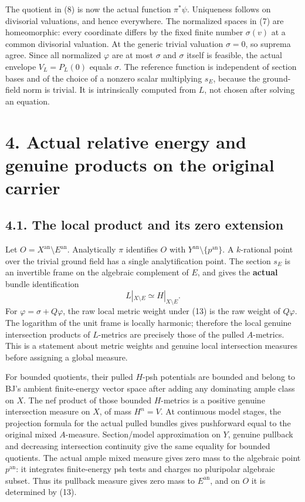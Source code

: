 \documentclass[
  10pt,
]{article}
\begin{document}
The quotient in (8) is now the actual function \(\pi^*\psi\). Uniqueness
follows on divisorial valuations, and hence everywhere. The normalized
spaces in (7) are homeomorphic: every coordinate differs by the fixed
finite number \(\sigma(v)\) at a common divisorial valuation. At the
generic trivial valuation \(\sigma=0\), so suprema agree. Since all
normalized \(\varphi\) are at most \(\sigma\) and \(\sigma\) itself is
feasible, the actual envelope \(V_L=P_L(0)\) equals \(\sigma\). The
reference function is independent of section bases and of the choice of
a nonzero scalar multiplying \(s_E\), because the ground-field norm is
trivial. It is intrinsically computed from \(L\), not chosen after
solving an equation.

\section{4. Actual relative energy and genuine products on the original
carrier}\label{actual-relative-energy-and-genuine-products-on-the-original-carrier}

\subsection{4.1. The local product and its zero
extension}\label{the-local-product-and-its-zero-extension}

Let \(O=X^{\mathrm{an}}\setminus E^{\mathrm{an}}\). Analytically \(\pi\)
identifies \(O\) with \(Y^{\mathrm{an}}\setminus\{p^{\mathrm{an}}\}\). A
\(k\)-rational point over the trivial ground field has a single
analytification point. The section \(s_E\) is an invertible frame on the
algebraic complement of \(E\), and gives the \textbf{actual} bundle
identification \[ L|_{X\setminus E}\simeq H|_{X\setminus E}. \tag{13} \]
For \(\varphi=\sigma+Q\varphi\), the raw local metric weight under (13)
is the raw weight of \(Q\varphi\). The logarithm of the unit frame is
locally harmonic; therefore the local genuine intersection products of
\(L\)-metrics are precisely those of the pulled \(A\)-metrics. This is a
statement about metric weights and genuine local intersection measures
before assigning a global measure.

For bounded quotients, their pulled \(H\)-psh potentials are bounded and
belong to BJ's ambient finite-energy vector space after adding any
dominating ample class on \(X\). The nef product of those bounded
\(H\)-metrics is a positive genuine intersection measure on \(X\), of
mass \(H^n=V\). At continuous model stages, the projection formula for
the actual pulled bundles gives pushforward equal to the original mixed
\(A\)-measure. Section/model approximation on \(Y\), genuine pullback
and decreasing intersection continuity give the same equality for
bounded quotients. The actual ample mixed measure gives zero mass to the
algebraic point \(p^{\mathrm{an}}\): it integrates finite-energy psh
tests and charges no pluripolar algebraic subset. Thus its pullback
measure gives zero mass to \(E^{\mathrm{an}}\), and on \(O\) it is
determined by (13).
\end{document}
